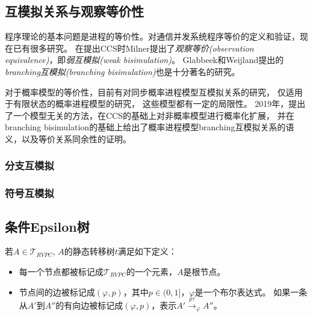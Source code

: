 \subsection{互模拟关系与观察等价性}

   程序理论的基本问题是进程的等价性。对通信并发系统程序等价的定义和验证，现在已有很多研究。
   在提出CCS时Milner提出了\textit{观察等价(observation equivalence)}，即\textit{弱互模拟(weak bisimulation)}\cite{2}。
   Glabbeek和Weijland提出的\textit{branching互模拟(branching bisimulation)}\cite{6}也是十分著名的研究。

   对于概率模型的等价性，目前有对同步概率进程模型互模拟关系的研究\cite{13}，
   仅适用于有限状态的概率进程模型的研究\cite{14,15}，
   这些模型都有一定的局限性。
   2019年，\cite{7}提出了一个模型无关的方法，在CCS的基础上对非概率模型进行概率化扩展，
   并在branching bisimulation\cite{6}的基础上给出了概率进程模型branching互模拟关系的语义，以及等价关系同余性的证明。

   \subsubsection{分支互模拟}

   \subsubsection{符号互模拟}
\subsection{条件Epsilon树}
\begin{definition}
   \label{def:silent_tree}
   若$A\in \mathcal{T}_{RVPC}$,
   $A$的静态转移树$t$满足如下定义：
   \begin{itemize}
   \item 每一个节点都被标记成$\mathcal{T}_{RVPC}$的一个元素，$A$是根节点。
   \item {
      节点间的边被标记成$(\varphi,p)$，其中$p\in(0,1]$，$\varphi$是一个布尔表达式。
      如果一条从$A'$到$A''$的有向边被标记成$(\varphi,p)$，表示$A'\stackrel{p\tau}{\rightarrow}_{\varphi} A''$。
   }
   \end{itemize}
\end{definition}


